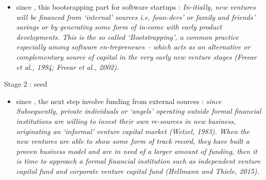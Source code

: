 \begin{itemize}
\begin{itemize}
\begin{itemize}
  \item since \citep{cavallo2019fostering}, this bootsrapping part for software startups : \textit{In-itially, new ventures will be financed from ‘internal’ sources i.e. foun-ders' or family and friends' savings or by generating some form of in-come with early product developments. This is the so called ‘Bootstrapping’, a common practice especially among software en-trepreneurs – which acts as an alternative or complementary source of capital in the very early new venture stages (Freear et al., 1994; Freear et al., 2002).}
\end{itemize}


Stage 2 : seed
\begin{itemize}
    \item since \citep{cavallo2019fostering}, the next step involve funding from external sources : \textit{since Subsequently, private individuals or ‘angels’ operating outside formal financial institutions are willing to invest their own re-sources in new business, originating an ‘informal’ venture capital market (Wetzel, 1983). When the new ventures are able to show some form of track record, they have built a proven business model and are in need of a larger amount of funding, then it is time to approach a formal financial institution such as independent venture capital fund and corporate venture capital fund (Hellmann and Thiele, 2015).}
\end{itemize}



\end{itemize}
\end{itemize}

